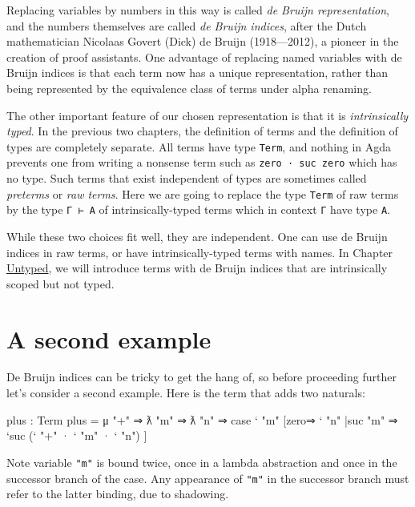 Replacing variables by numbers in this way is called \emph{de Bruijn
representation}, and the numbers themselves are called \emph{de Bruijn
indices}, after the Dutch mathematician Nicolaas Govert (Dick) de Bruijn
(1918---2012), a pioneer in the creation of proof assistants. One
advantage of replacing named variables with de Bruijn indices is that
each term now has a unique representation, rather than being represented
by the equivalence class of terms under alpha renaming.

The other important feature of our chosen representation is that it is
\emph{intrinsically typed}. In the previous two chapters, the definition
of terms and the definition of types are completely separate. All terms
have type \texttt{Term}, and nothing in Agda prevents one from writing a
nonsense term such as
\texttt{\textasciigrave{}zero\ ·\ \textasciigrave{}suc\ \textasciigrave{}zero}
which has no type. Such terms that exist independent of types are
sometimes called \emph{preterms} or \emph{raw terms}. Here we are going
to replace the type \texttt{Term} of raw terms by the type
\texttt{Γ\ ⊢\ A} of intrinsically-typed terms which in context
\texttt{Γ} have type \texttt{A}.

While these two choices fit well, they are independent. One can use de
Bruijn indices in raw terms, or have intrinsically-typed terms with
names. In Chapter \protect\hyperlink{Untyped}{Untyped}, we will
introduce terms with de Bruijn indices that are intrinsically scoped but
not typed.

\hypertarget{a-second-example}{%
\section{A second example}\label{a-second-example}}

De Bruijn indices can be tricky to get the hang of, so before proceeding
further let's consider a second example. Here is the term that adds two
naturals:

\begin{myDisplay}
plus : Term
plus = μ "+" ⇒ ƛ "m" ⇒ ƛ "n" ⇒
         case ` "m"
           [zero⇒ ` "n"
           |suc "m" ⇒ `suc (` "+" · ` "m" · ` "n") ]
\end{myDisplay}

Note variable \texttt{"m"} is bound twice, once in a lambda abstraction
and once in the successor branch of the case. Any appearance of
\texttt{"m"} in the successor branch must refer to the latter binding,
due to shadowing.

